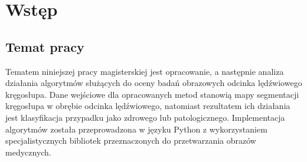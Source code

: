 \chapter{Wstęp}

\section{Temat pracy}

Tematem niniejszej pracy magisterskiej jest opracowanie, a następnie analiza działania algorytmów służących do oceny badań obrazowych odcinka lędźwiowego kręgosłupa.
Dane wejściowe dla opracowanych metod stanowią mapy segmentacji kręgosłupa w obrębie odcinka lędźwiowego, natomiast rezultatem ich działania jest klasyfikacja przypadku jako zdrowego lub patologicznego.
Implementacja algorytmów została przeprowadzona w języku Python z wykorzystaniem specjalistycznych bibliotek przeznaczonych do przetwarzania obrazów medycznych.

